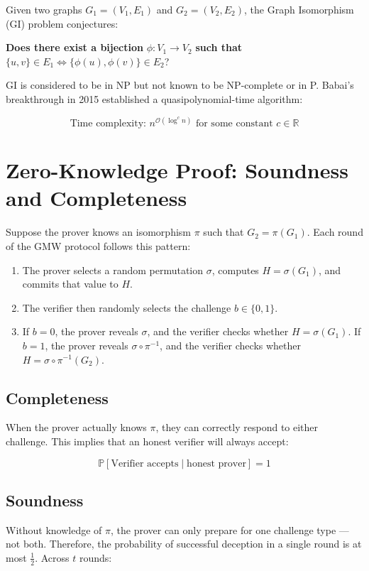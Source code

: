 
Given two graphs $G_1 = (V_1, E_1)$ and $G_2 = (V_2, E_2)$, the Graph Isomorphism (GI) problem conjectures:

\textbf{Does there exist a bijection } $\phi: V_1 \rightarrow V_2$ \textbf{ such that } $\{u, v\} \in E_1 \iff \{\phi(u), \phi(v)\} \in E_2$?

GI is considered to be in NP but not known to be NP-complete or in P. Babai's breakthrough in 2015 established a quasipolynomial-time algorithm:

\[
\text{Time complexity: } n^{\mathcal{O}(\log^c n)} \text{ for some constant } c \in \mathbb{R}
\]

\section*{Zero-Knowledge Proof: Soundness and Completeness}

Suppose the prover knows an isomorphism $\pi$ such that $G_2 = \pi(G_1)$.
Each round of the GMW protocol follows this pattern:

\begin{enumerate}
    \item The prover selects a random permutation $\sigma$, computes $H = \sigma(G_1)$, and commits that value to $H$.
    \item The verifier then randomly selects the challenge $b \in \{0, 1\}$.
    \item If $b = 0$, the prover reveals $\sigma$, and the verifier checks whether $H = \sigma(G_1)$.  
          If $b = 1$, the prover reveals $\sigma \circ \pi^{-1}$, and the verifier checks whether $H = \sigma \circ \pi^{-1}(G_2)$.
\end{enumerate}

\subsection*{Completeness}

When the prover actually knows $\pi$, they can correctly respond to either challenge. This implies that an honest verifier will always accept:

\[
\mathbb{P}[\text{Verifier accepts} \mid \text{honest prover}] = 1
\]

\subsection*{Soundness}

Without knowledge of $\pi$, the prover can only prepare for one challenge type — not both.  
Therefore, the probability of successful deception in a single round is at most $\frac{1}{2}$. Across $t$ rounds:

